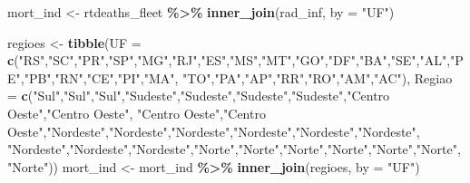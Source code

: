 \documentclass[
]{book}
\newenvironment{Shaded}{\begin{snugshade}}{\end{snugshade}}
\newcommand{\AttributeTok}[1]{\textcolor[rgb]{0.13,0.29,0.53}{#1}}
\newcommand{\FunctionTok}[1]{\textcolor[rgb]{0.13,0.29,0.53}{\textbf{#1}}}
\newcommand{\NormalTok}[1]{#1}
\newcommand{\OtherTok}[1]{\textcolor[rgb]{0.56,0.35,0.01}{#1}}
\newcommand{\SpecialCharTok}[1]{\textcolor[rgb]{0.81,0.36,0.00}{\textbf{#1}}}
\newcommand{\StringTok}[1]{\textcolor[rgb]{0.31,0.60,0.02}{#1}}
\begin{document}
\begin{Shaded}
\begin{Highlighting}[]
\NormalTok{mort\_ind }\OtherTok{\textless{}{-}}\NormalTok{ rtdeaths\_fleet }\SpecialCharTok{\%\textgreater{}\%} 
  \FunctionTok{inner\_join}\NormalTok{(rad\_inf, }\AttributeTok{by =} \StringTok{"UF"}\NormalTok{)}

\NormalTok{regioes }\OtherTok{\textless{}{-}} \FunctionTok{tibble}\NormalTok{(}\AttributeTok{UF =} \FunctionTok{c}\NormalTok{(}\StringTok{"RS"}\NormalTok{,}\StringTok{"SC"}\NormalTok{,}\StringTok{"PR"}\NormalTok{,}\StringTok{"SP"}\NormalTok{,}\StringTok{"MG"}\NormalTok{,}\StringTok{"RJ"}\NormalTok{,}\StringTok{"ES"}\NormalTok{,}\StringTok{"MS"}\NormalTok{,}\StringTok{"MT"}\NormalTok{,}\StringTok{"GO"}\NormalTok{,}\StringTok{"DF"}\NormalTok{,}\StringTok{"BA"}\NormalTok{,}\StringTok{"SE"}\NormalTok{,}\StringTok{"AL"}\NormalTok{,}\StringTok{"PE"}\NormalTok{,}\StringTok{"PB"}\NormalTok{,}\StringTok{"RN"}\NormalTok{,}\StringTok{"CE"}\NormalTok{,}\StringTok{"PI"}\NormalTok{,}\StringTok{"MA"}\NormalTok{,}
                            \StringTok{"TO"}\NormalTok{,}\StringTok{"PA"}\NormalTok{,}\StringTok{"AP"}\NormalTok{,}\StringTok{"RR"}\NormalTok{,}\StringTok{"RO"}\NormalTok{,}\StringTok{"AM"}\NormalTok{,}\StringTok{"AC"}\NormalTok{),}
                  \AttributeTok{Regiao =} \FunctionTok{c}\NormalTok{(}\StringTok{"Sul"}\NormalTok{,}\StringTok{"Sul"}\NormalTok{,}\StringTok{"Sul"}\NormalTok{,}\StringTok{"Sudeste"}\NormalTok{,}\StringTok{"Sudeste"}\NormalTok{,}\StringTok{"Sudeste"}\NormalTok{,}\StringTok{"Sudeste"}\NormalTok{,}\StringTok{"Centro Oeste"}\NormalTok{,}\StringTok{"Centro Oeste"}\NormalTok{,}
                             \StringTok{"Centro Oeste"}\NormalTok{,}\StringTok{"Centro Oeste"}\NormalTok{,}\StringTok{"Nordeste"}\NormalTok{,}\StringTok{"Nordeste"}\NormalTok{,}\StringTok{"Nordeste"}\NormalTok{,}\StringTok{"Nordeste"}\NormalTok{,}\StringTok{"Nordeste"}\NormalTok{,}\StringTok{"Nordeste"}\NormalTok{,}
                             \StringTok{"Nordeste"}\NormalTok{,}\StringTok{"Nordeste"}\NormalTok{,}\StringTok{"Nordeste"}\NormalTok{,}\StringTok{"Norte"}\NormalTok{,}\StringTok{"Norte"}\NormalTok{,}\StringTok{"Norte"}\NormalTok{,}\StringTok{"Norte"}\NormalTok{,}\StringTok{"Norte"}\NormalTok{,}\StringTok{"Norte"}\NormalTok{,}\StringTok{"Norte"}\NormalTok{))}
\NormalTok{mort\_ind }\OtherTok{\textless{}{-}}\NormalTok{ mort\_ind }\SpecialCharTok{\%\textgreater{}\%}
  \FunctionTok{inner\_join}\NormalTok{(regioes, }\AttributeTok{by =} \StringTok{"UF"}\NormalTok{)}
\end{Highlighting}
\end{Shaded}
\end{document}
